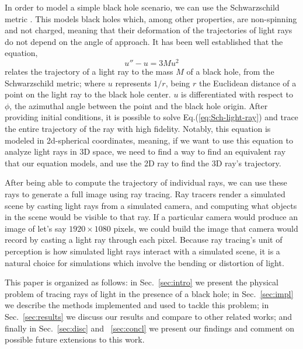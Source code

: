 In order to model a simple black hole scenario, we can use the Schwarzschild metric \cite{schw_soln-2007}.
This models black holes which, among other properties, are non-spinning and not charged,
meaning that their deformation of the trajectories of light rays do not depend on the angle of approach.
It has been well established \cite{gravitation-mtw} that the equation,
\begin{equation}
	u'' - u = 3 M u^2
	\label{eq:Sch-light-ray}
\end{equation}
relates the trajectory of a light ray to the mass $M$ of a black hole, from the Schwarzschild metric;
where $u$ represents $1/r$, being $r$ the Euclidean distance of a point on the light ray to the black hole center.
$u$ is differentiated with respect to $\phi$, the azimuthal angle between the point and the black hole origin.
After providing initial conditions,  it is possible to solve Eq.(\ref{eq:Sch-light-ray}) and trace the entire trajectory of the ray with high fidelity.
Notably, this equation is modeled in 2d-spherical coordinates, meaning, if we want to use this equation to analyze light rays in 3D space, we need to find a way to find an equivalent ray that our equation models, and use the 2D ray to find the 3D ray's trajectory.

After being able to compute the trajectory of individual rays, we can use these rays to generate a full image using ray tracing. Ray tracers render a simulated scene by casting light rays from a simulated camera, and computing what objects in the scene would be visible to that ray. If a particular camera would produce an image of let's say $1920 \times 1080$ pixels, we could build the image that camera would record by casting a light ray through each pixel. Because ray tracing's unit of perception is how simulated light rays interact with a simulated scene, it is a natural choice for simulations which involve the bending or distortion of light.


This paper is organized as follows:
in Sec.~\ref{sec:intro} we present the physical problem of tracing rays of light in the presence of a black hole;
in Sec.~\ref{sec:impl} we describe the methods implemented and used to tackle this problem;
in Sec.~\ref{sec:results} we discuss our results and compare to other related works;
and finally in Sec.~\ref{sec:disc} and ~\ref{sec:concl} we present our findings and comment
on possible future extensions to this work.

